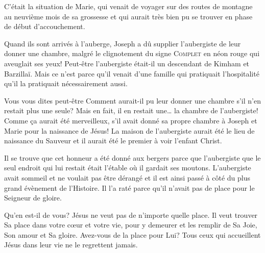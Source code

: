 C'était la situation de Marie, qui venait de voyager sur des routes de montagne au neuvième mois de sa grossesse et qui aurait très bien pu se trouver en phase de début d'accouchement.

Quand ils sont arrivés à l'auberge, Joseph a dû supplier l'aubergiste de leur donner une chambre, malgré le clignotement du signe \textsc{Complet} en néon rouge qui aveuglait ses yeux! Peut-être l'aubergiste était-il un descendant de Kimham et Barzillaï. Mais ce n'est parce qu'il venait d'une famille qui pratiquait l'hospitalité qu'il la pratiquait nécessairement aussi.

Vous vous dites peut-être\frcolon{} \Og Comment aurait-il pu leur donner une chambre s'il n'en restait plus une seule? \Fg{} Mais en fait, il en restait une… la chambre de l'aubergiste! Comme ça aurait été merveilleux, s'il avait donné sa propre chambre à Joseph et Marie pour la naissance de Jésus! La maison de l'aubergiste aurait été le lieu de naissance du Sauveur et il aurait été le premier à voir l'enfant Christ.

Il se trouve que cet honneur a été donné aux bergers parce que l'aubergiste que le seul endroit qui lui restait était l'étable où il gardait ses moutons. L'aubergiste avait sommeil et ne voulait pas être dérangé et il est ainsi passé à côté du plus grand évènement de l'Histoire. Il l'a raté parce qu'il n'avait pas de place pour le Seigneur de gloire.

Qu'en est-il de vous? Jésus ne veut pas de n'importe quelle place. Il veut trouver Sa place dans votre cœur et votre vie, pour y demeurer et les remplir de Sa Joie, Son amour et Sa gloire. Avez-vous de la place pour Lui? Tous ceux qui accueillent Jésus dans leur vie ne le regrettent jamais.


\begin{dvquotes}


\end{dvquotes}
